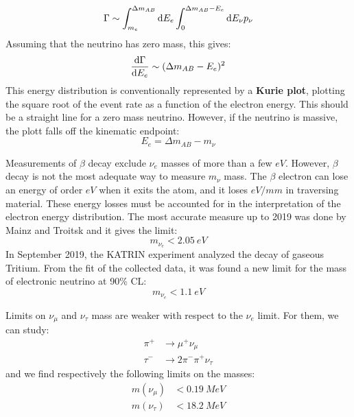 \documentclass[../../main/main.tex]{subfiles}
\begin{document}
\begin{equation}
	\Gamma
	\sim
	\int_{m_e}^{\Delta m_{AB}} \mathrm{d}{E_e}
	\int_{0}^{\Delta m_{AB} - E_e} \mathrm{d}{E_{\nu}} p_{\nu}
	\label{eq:}
\end{equation}
Assuming that the neutrino has zero mass, this gives:
\begin{equation}
	\dv{\Gamma}{E_e}
	\sim
	(\Delta m_{AB} - E_e)^2
	\label{eq:}
\end{equation}
This energy distribution is conventionally represented by a \textbf{Kurie plot}, plotting the square root of the event rate as a function of the electron energy. This should be a straight line for a zero mass neutrino. However, if the neutrino is massive, the plott falls off the kinematic endpoint:
\begin{equation}
	E_e
	=
	\Delta m_{AB} - m_{\nu}
	\label{eq:}
\end{equation}

Measurements of \( \beta \) decay exclude \( \nu_e \) masses of more than a few \( \si{eV} \). However, \( \beta \) decay is not the most adequate way to measure \( m_{\nu} \) mass. The \( \beta \) electron can lose an energy of order \( \si{eV} \) when it exits the atom, and it loses \( \si{eV/mm} \) in traversing material. These energy losses must be accounted for in the interpretation of the electron energy distribution. The most accurate measure up to 2019 was done by Mainz and Troitsk and it gives the limit:
\begin{equation}
	m_{\nu_e}
	<
	2.05 \ \si{eV}
	\label{eq:}
\end{equation}
In September 2019, the KATRIN experiment analyzed the decay of gaseous Tritium. From the fit of the collected data, it was found a new limit for the mass of electronic neutrino at 90\% CL:
\begin{equation}
	m_{\nu_e}
	<
	1.1 \ \si{eV}
	\label{eq:}
\end{equation}

Limits on \( \nu_{\mu} \) and \( \nu_{\tau} \) mass are weaker with respect to the \( \nu_e \) limit. For them, we can study:
\begin{align}
	\pi^+ &\longrightarrow \mu^+ \nu_{\mu}	\\
	\tau^- &\longrightarrow 2\pi^-\pi^+ \nu_{\tau}
	\label{eq:}
\end{align}
and we find respectively the following limits on the masses:
\begin{align}
	m(\nu_{\mu}) &< 0.19 \ \si{MeV}	\\
	m(\nu_{\tau})&< 18.2 \ \si{MeV}
\end{align}
\end{document}
